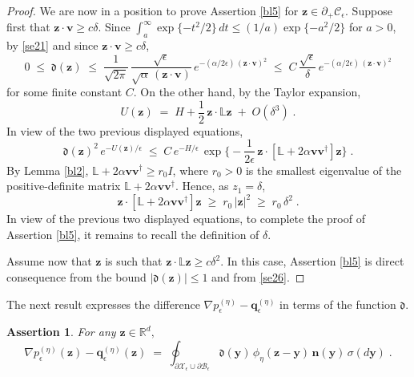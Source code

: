 \documentclass[reqno]{amsart}
\newcounter{as}[section]
\newtheorem{asser}[as]{Assertion}
\newcommand{\mc}[1]{{\mathcal #1}}
\newcommand{\mf}[1]{{\mathfrak #1}}
\newcommand{\bb}[1]{{\mathbb #1}}
\newcommand{\bs}[1]{{\boldsymbol #1}}
\newcommand{\<}{\langle}
\renewcommand{\>}{\rangle}
\begin{document}
\begin{proof}
We are now in a position to prove Assertion \ref{bl5} for $\bs{z}
\in \partial_{+} \mc{C}_{\epsilon}$. Suppose first that
$\bs{z}\cdot\bs{v} \ge c\delta$. Since $\int_{a}^{\infty}\exp \{ -
t^{2}/2 \} \, dt \le (1/a) \exp \{ - a^{2}/2 \}$ for $a>0$, by
\eqref{se21} and since $\bs{z}\cdot\bs{v} \ge c\delta$,
\begin{equation*}
0\;\le\;\mf{d}(\bs{z})\;\le\;\frac{1}{\sqrt{2\pi}}\,
\frac{\sqrt{\epsilon}} {\sqrt{\alpha} \, (\bs{z}\cdot\bs{v})}\,
e^{-(\alpha/2\epsilon) \, (\bs{z}\cdot\bs{v})^{2}} \;\le\;
C\, \frac{\sqrt{\epsilon}}{\delta}\,
e^{-(\alpha/2\epsilon)\, (\bs{z}\cdot\bs{v})^{2}}
\end{equation*}
for some finite constant $C$. On the other hand, by the Taylor
expansion,
\begin{equation}
\label{se26}
U(\bs{z})\;=\;H+\frac{1}{2}\, \bs{z}\cdot\bb{L}\bs{z} \;+\; O(\delta^{3})\;.
\end{equation}
In view of the two previous displayed equations,
\begin{equation*}
\mf{d}(\bs{z})^{2} \, e^{-U(\bs{z})/\epsilon} \;\le\;
C\, e^{-H/\epsilon}\, \exp\Big\{ -\frac{1}{2\epsilon}\,
\bs{z}\cdot\left[\bb{L}+2\alpha\bs{v}\bs{v}^{\dagger}\right]\bs{z}\Big\} \;.
\end{equation*}
By Lemma \ref{bl2}, $\bb{L}+2\alpha\bs{v}\bs{v}^{\dagger}\ge r_{0}I$, where
$r_{0}>0$ is the smallest eigenvalue of the positive-definite matrix
$\bb{L}+2\alpha\bs{v}\bs{v}^{\dagger}$. Hence, as $z_1=\delta$,
\begin{equation*}
\bs{z}\cdot\left[\bb{L}+2\alpha\bs{v}\bs{v}^{\dagger}\right]\bs{z}
\;\ge\;r_{0}\, |\bs{z}|^{2}\;\ge\;r_{0}\, \delta^{2}\;.
\end{equation*}
In view of the previous two displayed equations, to complete the proof
of Assertion \ref{bl5}, it remains to recall the definition of
$\delta$.

Assume now that $\bs{z}$ is such that $\bs{z}\cdot\bb{L}\bs{z}\ge
c\delta^{2}$. In this case, Assertion \ref{bl5} is direct consequence
from the bound $|\mf{d}(\bs{z})|\le1$ and from \eqref{se26}.
\end{proof}

The next result expresses the difference $\nabla p_{\epsilon}^{(\eta)}
- \bs{q}_{\epsilon}^{(\eta)}$ in terms of the function $\mf{d}$.

\begin{asser}
\label{bl4}
For any $\bs{z}\in\bb R^d,$
\begin{equation*}
\nabla p_{\epsilon}^{(\eta)}(\bs{z}) -
\bs{q}_{\epsilon}^{(\eta)}(\bs{z})
\;=\;\oint_{\partial\mc{X}_{\epsilon}\cup\partial\mc{B}_{\epsilon}}
\mf{d}(\bs{y})\, \phi_{\eta}(\bs{z}-\bs{y})\, \bs{n}(\bs{y})\,
\sigma(d\bs{y})\;.
\end{equation*}
\end{asser}
\end{document}
